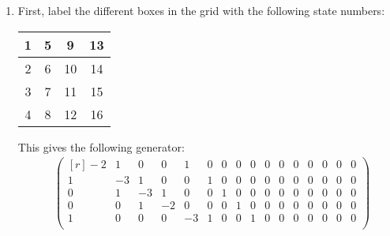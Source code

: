 \documentclass[12pt]{article}
\theoremstyle{plain}
\theoremstyle{definition}
\theoremstyle{remark}
\begin{document}
\begin{enumerate}
  \item %
    First, label the different boxes in the grid with the following
    state numbers:
    \begin{table}[htpb!]
      \centering
      \begin{tabular}{|c|c|c|c|}
        \hline
        1 & 5 & 9 & 13 \\\hline
        2 & 6 & 10 & 14 \\\hline
        3 & 7 & 11 & 15 \\\hline
        4 & 8 & 12 & 16 \\\hline
      \end{tabular}
    \end{table}
    This gives the following generator:
    \setcounter{MaxMatrixCols}{16}
    \begin{align*}
      &\begin{pmatrix}[r]
         -2 & 1 & 0 & 0 & 1 & 0 & 0 & 0 & 0 & 0 & 0 & 0 & 0 & 0 & 0 & 0 \\
          1 & -3& 1 & 0 & 0 & 1 & 0 & 0 & 0 & 0 & 0 & 0 & 0 & 0 & 0 & 0 \\
          0 & 1 &-3 & 1 & 0 & 0 & 1 & 0 & 0 & 0 & 0 & 0 & 0 & 0 & 0 & 0 \\
          0 & 0 & 1 & -2& 0 & 0 & 0 & 1 & 0 & 0 & 0 & 0 & 0 & 0 & 0 & 0 \\
          1 & 0 & 0 & 0 &-3 & 1 & 0 & 0 & 1 & 0 & 0 & 0 & 0 & 0 & 0 & 0 \\

\end{pmatrix}
\end{align*}
\end{enumerate}
\end{document}
